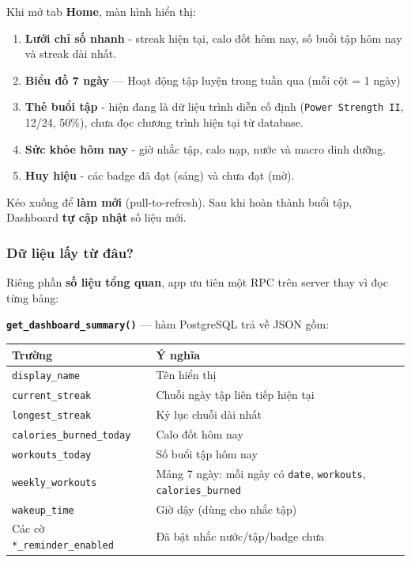 \documentclass[12pt,a4paper]{article}
\newcounter{none}
\providecommand{\tightlist}{%
  \setlength{\itemsep}{0pt}\setlength{\parskip}{0pt}}
\begin{document}
Khi mở tab \textbf{Home}, màn hình hiển thị:

\begin{enumerate}
\def\labelenumi{\arabic{enumi}.}
\tightlist
\item
  \textbf{Lưới chỉ số nhanh} - streak hiện tại, calo đốt hôm nay, số
  buổi tập hôm nay và streak dài nhất.
\item
  \textbf{Biểu đồ 7 ngày} --- Hoạt động tập luyện trong tuần qua (mỗi
  cột = 1 ngày)
\item
  \textbf{Thẻ buổi tập} - hiện đang là dữ liệu trình diễn cố định
  (\texttt{Power\ Strength\ II}, 12/24, 50\%), chưa đọc chương trình
  hiện tại từ database.
\item
  \textbf{Sức khỏe hôm nay} - giờ nhắc tập, calo nạp, nước và macro dinh
  dưỡng.
\item
  \textbf{Huy hiệu} - các badge đã đạt (sáng) và chưa đạt (mờ).
\end{enumerate}

Kéo xuống để \textbf{làm mới} (pull-to-refresh). Sau khi hoàn thành buổi
tập, Dashboard \textbf{tự cập nhật} số liệu mới.

\subsubsection{Dữ liệu lấy từ
đâu?}\label{dux1eef-liux1ec7u-lux1ea5y-tux1eeb-ux111uxe2u}

Riêng phần \textbf{số liệu tổng quan}, app ưu tiên một RPC trên server
thay vì đọc từng bảng:

\textbf{\texttt{get\_dashboard\_summary()}} --- hàm PostgreSQL trả về
JSON gồm:

{\def\LTcaptype{none} %
\begin{longtable}[]{@{}
  >{\raggedright\arraybackslash}p{}
  >{\raggedright\arraybackslash}p{}@{}}
\toprule\noalign{}
\begin{minipage}[b]{\linewidth}\raggedright
Trường
\end{minipage} & \begin{minipage}[b]{\linewidth}\raggedright
Ý nghĩa
\end{minipage} \\
\midrule\noalign{}
\endhead
\bottomrule\noalign{}
\endlastfoot
\texttt{display\_name} & Tên hiển thị \\
\texttt{current\_streak} & Chuỗi ngày tập liên tiếp hiện tại \\
\texttt{longest\_streak} & Kỷ lục chuỗi dài nhất \\
\texttt{calories\_burned\_today} & Calo đốt hôm nay \\
\texttt{workouts\_today} & Số buổi tập hôm nay \\
\texttt{weekly\_workouts} & Mảng 7 ngày: mỗi ngày có \texttt{date},
\texttt{workouts}, \texttt{calories\_burned} \\
\texttt{wakeup\_time} & Giờ dậy (dùng cho nhắc tập) \\
Các cờ \texttt{*\_reminder\_enabled} & Đã bật nhắc nước/tập/badge
chưa \\
\end{longtable}
}
\end{document}

